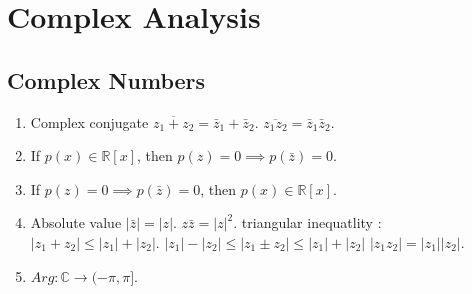 \chapter{Complex Analysis}
\section{Complex Numbers}
\begin{enumerate}
	\item Complex conjugate
		\subitem $\overline{z_1+z_2} = \bar{z}_1 + \bar{z}_2$.
		\subitem $\overline{z_1z_2} = \bar{z}_1 \bar{z}_2$.
	\item If $p(x) \in \mathbb{R}[x]$, then $p(z) = 0 \implies p(\bar{z}) = 0$.
	\item If $p(z) = 0 \implies p(\bar{z}) = 0$, then $p(x) \in \mathbb{R}[x]$.
	\item Absolute value
		\subitem $|\bar{z}| = |z|$.
		\subitem $z\bar{z} = |z|^2$.
		\subitem triangular inequatlity : $|z_1 + z_2 | \le |z_1| + |z_2|$.
		\subitem $|z_1| - |z_2| \le |z_1 \pm z_2| \le |z_1| + |z_2|$
		\subitem $|z_1z_2| = |z_1| |z_2|$.
	\item $Arg : \mathbb{C} \to (-\pi,\pi]$.
\end{enumerate}
